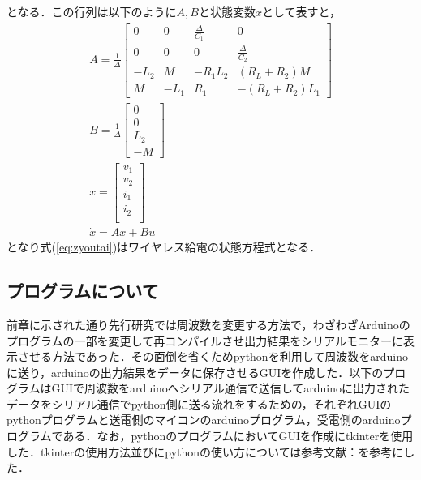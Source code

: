 \documentclass[12pt]{jarticle}
\begin{document}
となる．この行列は以下のように$A,Bと状態変数x$として表すと，
\begin{gather}
A=\frac{1}{\Delta}
\begin{bmatrix}
0 & 0 & \frac{\Delta}{C_1} & 0 \\
0 & 0 & 0 & \frac{\Delta}{C_2} \\
-L_2 & M & -R_1L_2 & (R_L+R_2)M \\
M & -L_1 & R_1 & -(R_L+R_2)L_1
\end{bmatrix}\\
B=\frac{1}{\Delta}
\begin{bmatrix}
0\\
0\\
L_2\\
-M
\end{bmatrix}\\
x=
\begin{bmatrix}
v_1\\
v_2\\
i_1\\
i_2\\
\end{bmatrix}\\
\label{eq:zyoutai}
\dot{x}=Ax+Bu
\end{gather}
となり式(\ref{eq:zyoutai})はワイヤレス給電の状態方程式となる．
\subsection{プログラムについて}
前章に示された通り先行研究では周波数を変更する方法で，わざわざArduinoのプログラムの一部を変更して再コンパイルさせ出力結果をシリアルモニターに表示させる方法であった．その面倒を省くためpythonを利用して周波数をarduinoに送り，arduinoの出力結果をデータに保存させるGUIを作成した．以下のプログラムはGUIで周波数をarduinoへシリアル通信で送信してarduinoに出力されたデータをシリアル通信でpython側に送る流れをするための，それぞれGUIのpythonプログラムと送電側のマイコンのarduinoプログラム，受電側のarduinoプログラムである．なお，pythonのプログラムにおいてGUIを作成にtkinterを使用した．tkinterの使用方法並びにpythonの使い方については参考文献：\cite{tkinter}を参考にした．
	
\end{document}
